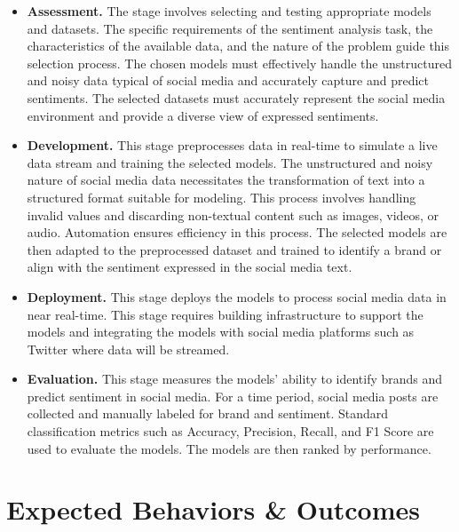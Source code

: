 \documentclass{article}
\begin{document}
\begin{itemize}[leftmargin=*]

    \item \textbf{Assessment.} The stage involves selecting and testing
          appropriate models and datasets. The specific requirements of the sentiment
          analysis task, the characteristics of the available data, and the nature of the
          problem guide this selection process. The chosen models must effectively handle
          the unstructured and noisy data typical of social media and accurately capture
          and predict sentiments. The selected datasets must accurately represent the
          social media environment and provide a diverse view of expressed sentiments.

    \item \textbf{Development.} This stage preprocesses data in real-time to
          simulate a live data stream and training the selected models. The unstructured
          and noisy nature of social media data necessitates the transformation of text
          into a structured format suitable for modeling. This process involves handling
          invalid values and discarding non-textual content such as images, videos, or
          audio. Automation ensures efficiency in this process. The selected models are
          then adapted to the preprocessed dataset and trained to identify a brand or
          align with the sentiment expressed in the social media text.

    \item \textbf{Deployment.} This stage deploys the models to process social
          media data in near real-time. This stage requires building infrastructure to
          support the models and integrating the models with social media platforms such
          as Twitter where data will be streamed.

    \item \textbf{Evaluation.} This stage measures the models' ability to
          identify brands and predict sentiment in social media. For a time period,
          social media posts are collected and manually labeled for brand and sentiment.
          Standard classification metrics such as Accuracy, Precision, Recall, and F1
          Score are used to evaluate the models. The models are then ranked by
          performance.

\end{itemize}

\section{Expected Behaviors \& Outcomes}
\end{document}
